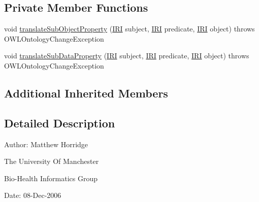 \subsection*{Private Member Functions}
\begin{DoxyCompactItemize}
\item 
void \hyperlink{classorg_1_1coode_1_1owlapi_1_1rdfxml_1_1parser_1_1_t_p_sub_property_of_handler_a135ff9ecfe5eea1469d857496598ec96}{translate\-Sub\-Object\-Property} (\hyperlink{classorg_1_1semanticweb_1_1owlapi_1_1model_1_1_i_r_i}{I\-R\-I} subject, \hyperlink{classorg_1_1semanticweb_1_1owlapi_1_1model_1_1_i_r_i}{I\-R\-I} predicate, \hyperlink{classorg_1_1semanticweb_1_1owlapi_1_1model_1_1_i_r_i}{I\-R\-I} object)  throws O\-W\-L\-Ontology\-Change\-Exception 
\item 
void \hyperlink{classorg_1_1coode_1_1owlapi_1_1rdfxml_1_1parser_1_1_t_p_sub_property_of_handler_a08107e14f0c485c348e41d0115114f69}{translate\-Sub\-Data\-Property} (\hyperlink{classorg_1_1semanticweb_1_1owlapi_1_1model_1_1_i_r_i}{I\-R\-I} subject, \hyperlink{classorg_1_1semanticweb_1_1owlapi_1_1model_1_1_i_r_i}{I\-R\-I} predicate, \hyperlink{classorg_1_1semanticweb_1_1owlapi_1_1model_1_1_i_r_i}{I\-R\-I} object)  throws O\-W\-L\-Ontology\-Change\-Exception 
\end{DoxyCompactItemize}
\subsection*{Additional Inherited Members}


\subsection{Detailed Description}
Author\-: Matthew Horridge\par
 The University Of Manchester\par
 Bio-\/\-Health Informatics Group\par
 Date\-: 08-\/\-Dec-\/2006\par
\par
 

